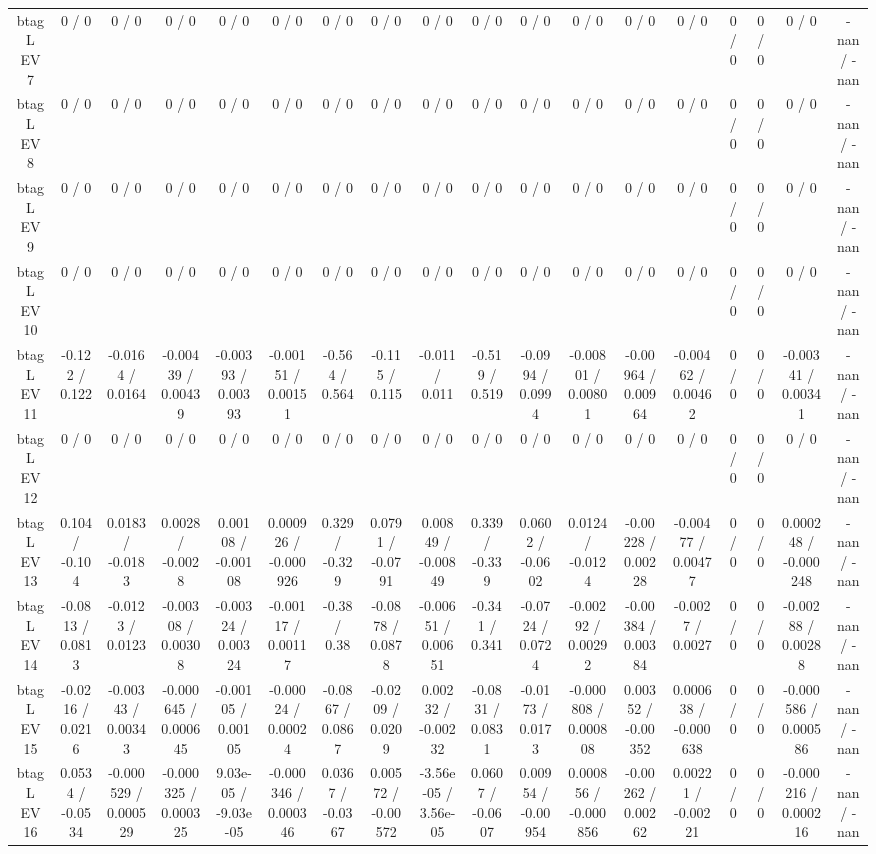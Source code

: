 \documentclass[10pt]{article}
\begin{document}
\begin{table}[htbp]
\begin{center}
\begin{tabular}{|c|c|c|c|c|c|c|c|c|c|c|c|c|c|c|c|c|c|}
  btag L EV 7 & 0 / 0 & 0 / 0 & 0 / 0 & 0 / 0 & 0 / 0 & 0 / 0 & 0 / 0 & 0 / 0 & 0 / 0 & 0 / 0 & 0 / 0 & 0 / 0 & 0 / 0 & 0 / 0 & 0 / 0 & 0 / 0 & -nan / -nan \\ 
  btag L EV 8 & 0 / 0 & 0 / 0 & 0 / 0 & 0 / 0 & 0 / 0 & 0 / 0 & 0 / 0 & 0 / 0 & 0 / 0 & 0 / 0 & 0 / 0 & 0 / 0 & 0 / 0 & 0 / 0 & 0 / 0 & 0 / 0 & -nan / -nan \\ 
  btag L EV 9 & 0 / 0 & 0 / 0 & 0 / 0 & 0 / 0 & 0 / 0 & 0 / 0 & 0 / 0 & 0 / 0 & 0 / 0 & 0 / 0 & 0 / 0 & 0 / 0 & 0 / 0 & 0 / 0 & 0 / 0 & 0 / 0 & -nan / -nan \\ 
  btag L EV 10 & 0 / 0 & 0 / 0 & 0 / 0 & 0 / 0 & 0 / 0 & 0 / 0 & 0 / 0 & 0 / 0 & 0 / 0 & 0 / 0 & 0 / 0 & 0 / 0 & 0 / 0 & 0 / 0 & 0 / 0 & 0 / 0 & -nan / -nan \\ 
  btag L EV 11 & -0.122 / 0.122 & -0.0164 / 0.0164 & -0.00439 / 0.00439 & -0.00393 / 0.00393 & -0.00151 / 0.00151 & -0.564 / 0.564 & -0.115 / 0.115 & -0.011 / 0.011 & -0.519 / 0.519 & -0.0994 / 0.0994 & -0.00801 / 0.00801 & -0.00964 / 0.00964 & -0.00462 / 0.00462 & 0 / 0 & 0 / 0 & -0.00341 / 0.00341 & -nan / -nan \\ 
  btag L EV 12 & 0 / 0 & 0 / 0 & 0 / 0 & 0 / 0 & 0 / 0 & 0 / 0 & 0 / 0 & 0 / 0 & 0 / 0 & 0 / 0 & 0 / 0 & 0 / 0 & 0 / 0 & 0 / 0 & 0 / 0 & 0 / 0 & -nan / -nan \\ 
  btag L EV 13 & 0.104 / -0.104 & 0.0183 / -0.0183 & 0.0028 / -0.0028 & 0.00108 / -0.00108 & 0.000926 / -0.000926 & 0.329 / -0.329 & 0.0791 / -0.0791 & 0.00849 / -0.00849 & 0.339 / -0.339 & 0.0602 / -0.0602 & 0.0124 / -0.0124 & -0.00228 / 0.00228 & -0.00477 / 0.00477 & 0 / 0 & 0 / 0 & 0.000248 / -0.000248 & -nan / -nan \\ 
  btag L EV 14 & -0.0813 / 0.0813 & -0.0123 / 0.0123 & -0.00308 / 0.00308 & -0.00324 / 0.00324 & -0.00117 / 0.00117 & -0.38 / 0.38 & -0.0878 / 0.0878 & -0.00651 / 0.00651 & -0.341 / 0.341 & -0.0724 / 0.0724 & -0.00292 / 0.00292 & -0.00384 / 0.00384 & -0.0027 / 0.0027 & 0 / 0 & 0 / 0 & -0.00288 / 0.00288 & -nan / -nan \\ 
  btag L EV 15 & -0.0216 / 0.0216 & -0.00343 / 0.00343 & -0.000645 / 0.000645 & -0.00105 / 0.00105 & -0.00024 / 0.00024 & -0.0867 / 0.0867 & -0.0209 / 0.0209 & 0.00232 / -0.00232 & -0.0831 / 0.0831 & -0.0173 / 0.0173 & -0.000808 / 0.000808 & 0.00352 / -0.00352 & 0.000638 / -0.000638 & 0 / 0 & 0 / 0 & -0.000586 / 0.000586 & -nan / -nan \\ 
  btag L EV 16 & 0.0534 / -0.0534 & -0.000529 / 0.000529 & -0.000325 / 0.000325 & 9.03e-05 / -9.03e-05 & -0.000346 / 0.000346 & 0.0367 / -0.0367 & 0.00572 / -0.00572 & -3.56e-05 / 3.56e-05 & 0.0607 / -0.0607 & 0.00954 / -0.00954 & 0.000856 / -0.000856 & -0.00262 / 0.00262 & 0.00221 / -0.00221 & 0 / 0 & 0 / 0 & -0.000216 / 0.000216 & -nan / -nan \\ 

\end{tabular}
\end{center}
\end{table}
\end{document}
